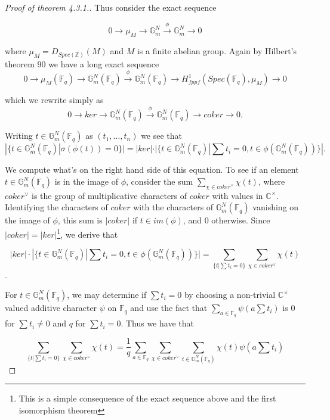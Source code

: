 \documentclass{ucbthesis}
\theoremstyle{definition}
\theoremstyle{theorem}
\begin{document}
\begin{proof}[Proof of theorem 4.3.1.]
Thus consider the exact sequence

$$ 0 \rightarrow \mu_{M} \rightarrow \mathbb{G}_{m}^{N} \xrightarrow{\phi} \mathbb{G}_{m}^{N}\rightarrow 0$$

where $\mu_{M} = D_{Spec(\mathbb{Z})}(M)$ and $M$ is a finite abelian group. Again by Hilbert's theorem 90 we have a long exact sequence 
$$ 0 \rightarrow \mu_{M}(\mathbb{F}_{q}) \rightarrow \mathbb{G}_{m}^{N}(\mathbb{F}_{q}) \xrightarrow{\phi} \mathbb{G}_{m}^{N}(\mathbb{F}_{q})\rightarrow H^{1}_{fppf}(Spec(\mathbb{F}_q),\mu_{M})\rightarrow 0$$

which we rewrite simply as 
$$ 0 \rightarrow ker \rightarrow \mathbb{G}_{m}^{N}(\mathbb{F}_{q}) \xrightarrow{\phi} \mathbb{G}_{m}^{N}(\mathbb{F}_{q})\rightarrow coker \rightarrow 0.$$

Writing $t\in \mathbb{G}_{m}^{N}(\mathbb{F}_{q})$ as $(t_{1},\ldots,t_{n})$ we see that 
$$|\{t\in \mathbb{G}_{m}^{N}(\mathbb{F}_q)|\sigma(\phi(t))=0\}| = |ker|\cdot|\{t\in \mathbb{G}_{m}^{N}(\mathbb{F}_q)|\sum t_{i} = 0, t\in\phi(\mathbb{G}_{m}^{N}(\mathbb{F}_q))\}|.$$

We compute what's on the right hand side of this equation. To see if an element $t\in\mathbb{G}_{m}^{N}(\mathbb{F}_q)$ is in the image of $\phi$, consider the sum
 $\sum\limits_{\chi\in coker^{\vee}}\chi(t)$, where $coker^{\vee}$ is the group of multiplicative characters of
  $coker$ with values in $\mathbb{C}^{\times}$. Identifying the characters of $coker$ with the characters of
   $\mathbb{G}_{m}^{N}(\mathbb{F}_q)$ vanishing on the image of $\phi$, this sum is $|coker|$ if
    $t\in im(\phi)$, and $0$ otherwise. Since $|coker|  = |ker|$\footnote{This is a simple consequence of the exact sequence above and the first isomorphism theorem}, we derive that 
    

$$|ker|\cdot|\{t\in \mathbb{G}_{m}^{N}(\mathbb{F}_q)|\sum t_{i} = 0, t\in\phi(\mathbb{G}_{m}^{N}(\mathbb{F}_q))\}| = \sum\limits_{\{t | \sum t_{i} = 0\}}\sum\limits_{\chi\in  coker^{\vee}}\chi(t)$$. 

For $t\in\mathbb{G}_{m}^{N}(\mathbb{F}_q)$, we may determine if $\sum t_{i} = 0$ by choosing a non-trivial
 $\mathbb{C}^{\times}$ valued additive character $\psi$ on $\mathbb{F}_q$ and use the fact that
  $\sum\limits_{a\in \mathbb{F}_q}\psi(a\sum t_i)$ is $0$ for $\sum t_i \neq 0$ and $q$ for $\sum t_i = 0$.
   Thus we have that 

$$\sum\limits_{\{t | \sum t_{i} = 0\}}\sum\limits_{\chi\in coker^{\vee}}\chi(t)
 = \frac{1}{q}\sum\limits_{a\in \mathbb{F}_q}\sum\limits_{\chi\in
  coker^{\vee}}\sum\limits_{t\in\mathbb{G}_{m}^{N}(\mathbb{F}_q)} \chi(t)\psi(a\sum t_i)$$
 


\end{proof}
\end{document}
